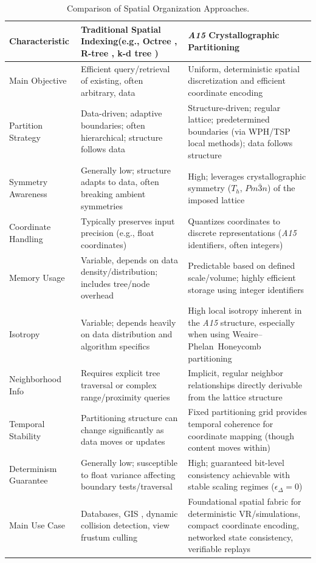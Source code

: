\documentclass[10pt]{article}
\def\AAAB{\textit{A15}}
\def\WP{Weaire--Phelan}
\def\WPH{\WP{}~Honeycomb}
\begin{document}
\begin{table}[!ht]
\centering
\caption{Comparison of Spatial Organization Approaches.}
\label{tab-comparison-indexing}
\begin{tabularx}{\textwidth}{>{\raggedright\arraybackslash}p{} >{\raggedright\arraybackslash}p{} >{\raggedright\arraybackslash}X}
\toprule
\textbf{Characteristic} & \textbf{Traditional Spatial Indexing}\newline (e.g., Octree \cite{Finkel1974}, R-tree \cite{Guttman1984}, k-d tree \cite{Bentley1975}) & \textbf{\AAAB{} Crystallographic Partitioning} \\
\midrule
Main Objective & Efficient query/retrieval of existing, often arbitrary, data & Uniform, deterministic spatial discretization and efficient coordinate encoding \\ \addlinespace
Partition Strategy & Data-driven; adaptive boundaries; often hierarchical; structure follows data & Structure-driven; regular lattice; predetermined boundaries (via WPH/TSP local methods); data follows structure \\ \addlinespace
Symmetry Awareness & Generally low; structure adapts to data, often breaking ambient symmetries & High; leverages crystallographic symmetry ($T_h$, $Pm\bar{3}n$) of the imposed lattice \\ \addlinespace
Coordinate Handling & Typically preserves input precision (e.g., float coordinates) & Quantizes coordinates to discrete representations (\AAAB{} identifiers, often integers) \\ \addlinespace
Memory Usage & Variable, depends on data density/distribution; includes tree/node overhead & Predictable based on defined scale/volume; highly efficient storage using integer identifiers \\ \addlinespace
Isotropy & Variable; depends heavily on data distribution and algorithm specifics & High local isotropy inherent in the \AAAB{} structure, especially when using \WPH{} partitioning \\ \addlinespace
Neighborhood Info & Requires explicit tree traversal or complex range/proximity queries & Implicit, regular neighbor relationships directly derivable from the lattice structure \\ \addlinespace
Temporal Stability & Partitioning structure can change significantly as data moves or updates & Fixed partitioning grid provides temporal coherence for coordinate mapping (though content moves within) \\ \addlinespace
Determinism Guarantee & Generally low; susceptible to float variance affecting boundary tests/traversal & High; guaranteed bit-level consistency achievable with stable scaling regimes ($\epsilon_\Delta = 0$) \\ \addlinespace
Main Use Case & Databases, GIS \cite{Samet1990}, dynamic collision detection, view frustum culling & Foundational spatial fabric for deterministic VR/simulations, compact coordinate encoding, networked state consistency, verifiable replays \\
\bottomrule
\end{tabularx}
\end{table}
\end{document}
